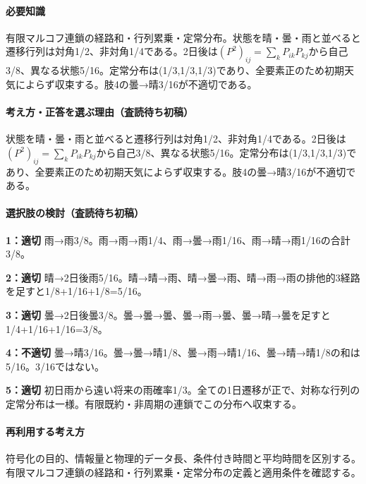 \paragraph{必要知識} 有限マルコフ連鎖の経路和・行列累乗・定常分布。状態を晴・曇・雨と並べると遷移行列は対角1/2、非対角1/4である。2日後は\((P^2)_{ij}=\sum_kP_{ik}P_{kj}\)から自己3/8、異なる状態5/16。定常分布は(1/3,1/3,1/3)であり、全要素正のため初期天気によらず収束する。肢4の曇→晴3/16が不適切である。

\paragraph{考え方・正答を選ぶ理由（査読待ち初稿）} 状態を晴・曇・雨と並べると遷移行列は対角1/2、非対角1/4である。2日後は\((P^2)_{ij}=\sum_kP_{ik}P_{kj}\)から自己3/8、異なる状態5/16。定常分布は(1/3,1/3,1/3)であり、全要素正のため初期天気によらず収束する。肢4の曇→晴3/16が不適切である。

\paragraph{選択肢の検討（査読待ち初稿）}\mbox{}\par

\noindent\textbf{1：適切} 雨→雨3/8。雨→雨→雨1/4、雨→曇→雨1/16、雨→晴→雨1/16の合計3/8。\par

\noindent\textbf{2：適切} 晴→2日後雨5/16。晴→晴→雨、晴→曇→雨、晴→雨→雨の排他的3経路を足すと1/8+1/16+1/8=\allowbreak{}5/16。\par

\noindent\textbf{3：適切} 曇→2日後曇3/8。曇→曇→曇、曇→雨→曇、曇→晴→曇を足すと1/4+1/16+1/16=\allowbreak{}3/8。\par

\noindent\textbf{4：不適切} 曇→晴3/16。曇→曇→晴1/8、曇→雨→晴1/16、曇→晴→晴1/8の和は5/16。3/16ではない。\par

\noindent\textbf{5：適切} 初日雨から遠い将来の雨確率1/3。全ての1日遷移が正で、対称な行列の定常分布は一様。有限既約・非周期の連鎖でこの分布へ収束する。\par

\paragraph{再利用する考え方} 符号化の目的、情報量と物理的データ長、条件付き時間と平均時間を区別する。有限マルコフ連鎖の経路和・行列累乗・定常分布の定義と適用条件を確認する。

